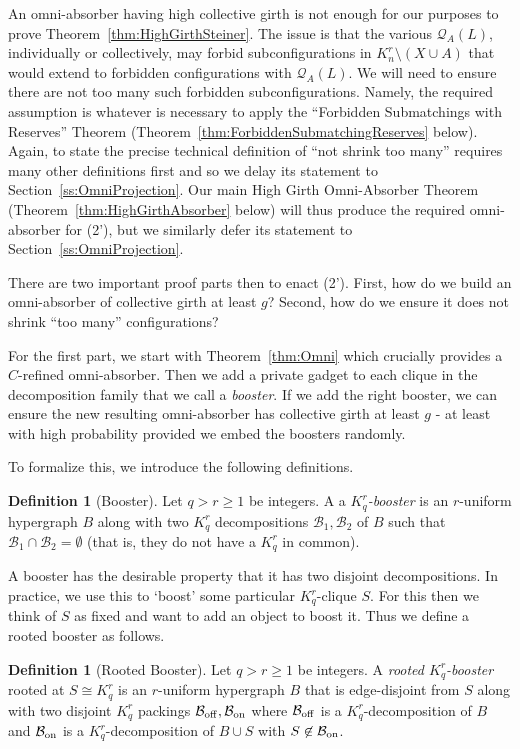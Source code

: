 \documentclass[11pt]{article}
\newcounter{i}
\theoremstyle{plain}
\theoremstyle{plain} %
\theoremstyle{definition}
\newtheorem{definition}[thm]{Definition}
\begin{document}
An omni-absorber having high collective girth is not enough for our purposes to prove Theorem~\ref{thm:HighGirthSteiner}. The issue is that the various $\mathcal{Q}_A(L)$, individually or collectively, may forbid subconfigurations in $K_n^r\setminus (X\cup A)$ that would extend to forbidden configurations with $\mathcal{Q}_A(L)$. We will need to ensure there are not too many such forbidden subconfigurations. Namely, the required assumption is whatever is necessary to apply the ``Forbidden Submatchings with Reserves'' Theorem (Theorem~\ref{thm:ForbiddenSubmatchingReserves} below). Again, to state the precise technical definition of ``not shrink too many'' requires many other definitions first and so we delay its statement to Section~\ref{ss:OmniProjection}. Our main High Girth Omni-Absorber Theorem (Theorem~\ref{thm:HighGirthAbsorber} below) will thus produce the required omni-absorber for (2'), but we similarly defer its statement to Section~\ref{ss:OmniProjection}.


There are two important proof parts then to enact (2'). First, how do we build an omni-absorber of collective girth at least $g$? Second, how do we ensure it does not shrink ``too many'' configurations?

For the first part, we start with Theorem~\ref{thm:Omni} which crucially provides a $C$-refined omni-absorber. Then we add a private gadget to each clique in the decomposition family that we call a \emph{booster}. If we add the right booster, we can ensure the new resulting omni-absorber has collective girth at least $g$ - at least with high probability provided we embed the boosters randomly. 

To formalize this, we introduce the following definitions.

\begin{definition}[Booster]
Let $q > r\ge 1$ be integers. A a \emph{$K_q^r$-booster} is an $r$-uniform hypergraph $B$ along with two $K_q^r$ decompositions $\mathcal{B}_1,\mathcal{B}_2$ of $B$ such that $\mathcal{B}_1\cap \mathcal{B}_2 =\emptyset$ (that is, they do not have a $K_q^r$ in common). 
\end{definition}

A booster has the desirable property that it has two disjoint decompositions. In practice, we use this to `boost' some particular $K_q^r$-clique $S$. For this then we think of $S$ as fixed and want to add an object to boost it. Thus we define a rooted booster as follows.

\begin{definition}[Rooted Booster]\label{def:rootedbooster}
Let $q > r\ge 1$ be integers. A \emph{rooted $K_q^r$-booster} rooted at $S\cong K_q^r$ is an $r$-uniform hypergraph $B$ that is edge-disjoint from $S$ along with two disjoint $K_q^r$ packings $\mathcal{B}_{{\rm off}},\mathcal{B}_{{\rm on}}$ where $\mathcal{B}_{{\rm off}}$ is a $K_q^r$-decomposition of $B$ and $\mathcal{B}_{{\rm on}}$ is a $K_q^r$-decomposition of $B\cup S$ with $S\not\in \mathcal{B}_{{\rm on}}$.
\end{definition}
\end{document}
